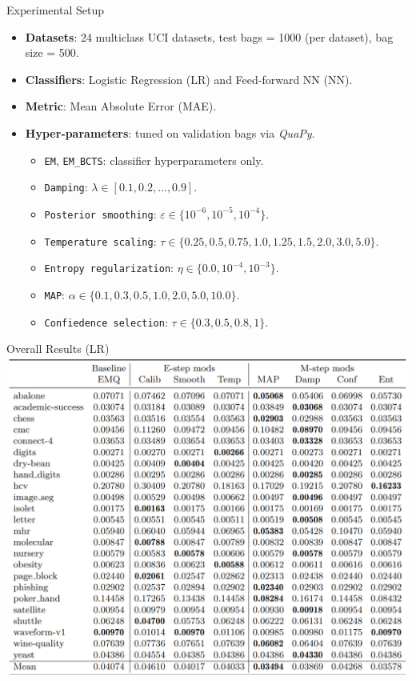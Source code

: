 \documentclass[aspectratio=169]{beamer}
\begin{document}
\begin{frame}{Experimental Setup}
  \begin{itemize}
    \item \textbf{Datasets}: 24 multiclass UCI datasets, test bags = 1000 (per dataset), bag size = 500.
    \item \textbf{Classifiers}: Logistic Regression (LR) and Feed‑forward NN (NN).
    \item \textbf{Metric}: Mean Absolute Error (MAE).
    \item \textbf{Hyper‑parameters}: tuned on validation bags via \textit{QuaPy}.
        \begin{itemize}
            \item \texttt{EM}, \texttt{EM\_BCTS}: classifier hyperparameters only.
            \item \texttt{Damping}: $\lambda \in [0.1, 0.2, \dots, 0.9]$.
            \item \texttt{Posterior smoothing}: $\varepsilon \in \{10^{-6}, 10^{-5}, 10^{-4}\}$.
            \item \texttt{Temperature scaling}: $\tau \in \{0.25, 0.5, 0.75, 1.0, 1.25, 1.5, 2.0, 3.0, 5.0\}$.
            \item \texttt{Entropy regularization}: $\eta \in \{0.0, 10^{-4}, 10^{-3}\}$.
            \item \texttt{MAP}: $\alpha \in \{0.1, 0.3, 0.5, 1.0, 2.0, 5.0, 10.0\}$.
            \item \texttt{Confiedence selection}: $\tau \in \{0.3, 0.5, 0.8, 1\}$.
        \end{itemize}
  \end{itemize}
\end{frame}


\begin{frame}{Overall Results (LR)}
  \centering
  \includegraphics[width=0.6\linewidth]{images/results_lr.png}
\end{frame}
\end{document}
